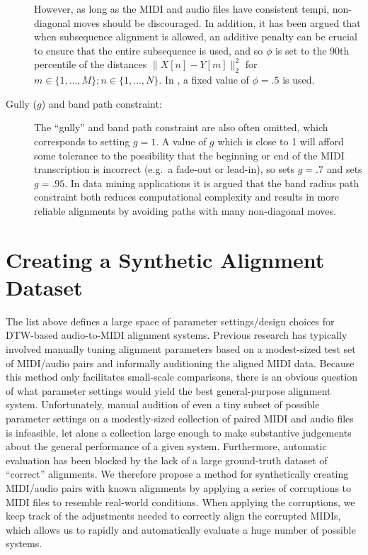 \begin{description}
However, as long as the MIDI and audio files have consistent tempi, non-diagonal moves should be discouraged.
In addition, it has been argued \cite{raffel2015large} that when subsequence alignment is allowed, an additive penalty can be crucial to ensure that the entire subsequence is used, and so $\phi$ is set to the 90th percentile of the distances $\|X[n] - Y[m]\|_2^2$ for $m \in \{1, \ldots, M\}; n \in \{1, \ldots, N\}$.
In \cite{ellis2013aligning}, a fixed value of $\phi = .5$ is used.
\item[Gully ($g$) and band path constraint:] The ``gully'' and band path constraint are also often omitted, which corresponds to setting $g = 1$.
A value of $g$ which is close to 1 will afford some tolerance to the possibility that the beginning or end of the MIDI transcription is incorrect (e.g.\ a fade-out or lead-in), so \cite{ellis2013aligning} sets $g = .7$ and \cite{raffel2015large} sets $g = .95$.
In data mining applications \cite{ratanamahatana2004everything} it is argued that the band radius path constraint both reduces computational complexity and results in more reliable alignments by avoiding paths with many non-diagonal moves.
\end{description}

\section{Creating a Synthetic Alignment Dataset}
\label{sec:synthetic}

The list above defines a large space of parameter settings/design choices for DTW-based audio-to-MIDI alignment systems.
Previous research has typically involved manually tuning alignment parameters based on a modest-sized test set of MIDI/audio pairs and informally auditioning the aligned MIDI data.
Because this method only facilitates small-scale comparisons, there is an obvious question of what parameter settings would yield the best general-purpose alignment system.
Unfortunately, manual audition of even a tiny subset of possible parameter settings on a modestly-sized collection of paired MIDI and audio files is infeasible, let alone a collection large enough to make substantive judgements about the general performance of a given system.
Furthermore, automatic evaluation has been blocked by the lack of a large ground-truth dataset of ``correct'' alignments.
We therefore propose a method for synthetically creating MIDI/audio pairs with known alignments by applying a series of corruptions to MIDI files to resemble real-world conditions.
When applying the corruptions, we keep track of the adjustments needed to correctly align the corrupted MIDIs, which allows us to rapidly and automatically evaluate a huge number of possible systems.

